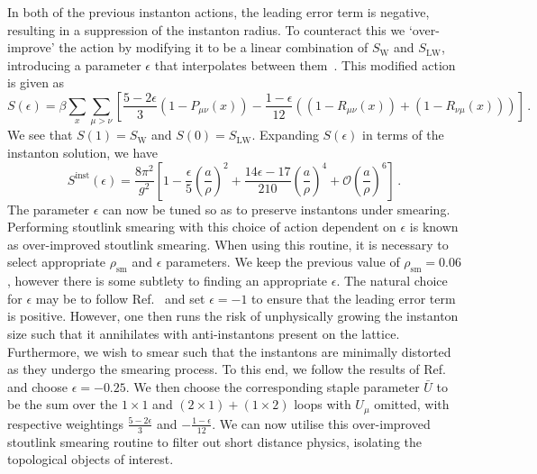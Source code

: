 In both of the previous instanton actions, the leading error term is negative, resulting in a suppression of the instanton radius. To counteract this we `over-improve' the action by modifying it to be a linear combination of $S_\text{W}$ and $S_\text{LW}$, introducing a parameter $\epsilon$ that interpolates between them~\cite{Moran:2008ra}. This modified action is given as
%
\begin{equation}
S ( \epsilon ) =  \beta \sum _ { x } \sum _ { \mu > \nu } \left[ \frac { 5 - 2 \epsilon } { 3 } \left( 1 - P _ { \mu \nu } ( x ) \right) - \frac { 1 - \epsilon } { 12 } \left( \left( 1 - R _ { \mu \nu } ( x ) \right) + \left( 1 - R _ { \nu \mu } ( x ) \right) \right) \right]\, .
\end{equation}
%
We see that $S(1)=S_\text{W}$ and $S(0) = S_\text{LW}$. Expanding $S(\epsilon)$ in terms of the instanton solution, we have
%
\begin{equation}
S^\text{inst}(\epsilon) = \frac { 8 \pi ^ { 2 } } { g ^ { 2 } } \left[ 1 - \frac { \epsilon } { 5 } \left( \frac { a } { \rho  } \right) ^ { 2 } + \frac { 14 \epsilon - 17 } { 210 } \left( \frac { a } { \rho } \right) ^ { 4 } + \mathcal { O } \left( \frac{a}{\rho} \right) ^ { 6 } \right]\, .
\end{equation}
%
The parameter $\epsilon$ can now be tuned so as to preserve instantons under smearing. Performing stoutlink smearing with this choice of action dependent on $\epsilon$ is known as over-improved stoutlink smearing. When using this routine, it is necessary to select appropriate $\rho_{\text{sm}}$ and $\epsilon$ parameters. We keep the previous value of $\rho_{\text{sm}}=0.06$, however there is some subtlety to finding an appropriate $\epsilon$. The natural choice for $\epsilon$ may be to follow Ref.~\cite{GarciaPerez:1993lic} and set $\epsilon=-1$ to ensure that the leading error term is positive. However, one then runs the risk of unphysically growing the instanton size such that it annihilates with anti-instantons present on the lattice. Furthermore, we wish to smear such that the instantons are minimally distorted as they undergo the smearing process. To this end, we follow the results of Ref.~\cite{Moran:2008ra} and choose $\epsilon = -0.25$. We then choose the corresponding staple parameter $\bar{U}$ to be the sum over the $1\times 1$ and $(2\times 1) + (1\times 2)$ loops with $U_\mu$ omitted, with respective weightings $\frac{5-2\epsilon}{3}$ and $-\frac{1-\epsilon}{12}$. We can now utilise this over-improved stoutlink smearing routine to filter out short distance physics, isolating the topological objects of interest.


